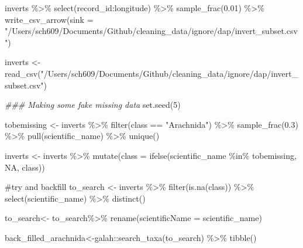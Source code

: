 \documentclass[
  letterpaper,
  DIV=11,
  numbers=noendperiod,
  oneside]{scrreprt}
\newenvironment{Shaded}{\begin{snugshade}}{\end{snugshade}}
\newcommand{\AttributeTok}[1]{\textcolor[rgb]{0.40,0.45,0.13}{#1}}
\newcommand{\CommentTok}[1]{\textcolor[rgb]{0.37,0.37,0.37}{#1}}
\newcommand{\ConstantTok}[1]{\textcolor[rgb]{0.56,0.35,0.01}{#1}}
\newcommand{\DecValTok}[1]{\textcolor[rgb]{0.68,0.00,0.00}{#1}}
\newcommand{\DocumentationTok}[1]{\textcolor[rgb]{0.37,0.37,0.37}{\textit{#1}}}
\newcommand{\FloatTok}[1]{\textcolor[rgb]{0.68,0.00,0.00}{#1}}
\newcommand{\FunctionTok}[1]{\textcolor[rgb]{0.28,0.35,0.67}{#1}}
\newcommand{\NormalTok}[1]{\textcolor[rgb]{0.00,0.23,0.31}{#1}}
\newcommand{\OtherTok}[1]{\textcolor[rgb]{0.00,0.23,0.31}{#1}}
\newcommand{\SpecialCharTok}[1]{\textcolor[rgb]{0.37,0.37,0.37}{#1}}
\newcommand{\StringTok}[1]{\textcolor[rgb]{0.13,0.47,0.30}{#1}}
\begin{document}
\begin{Shaded}
\begin{Highlighting}[]
\NormalTok{inverts }\SpecialCharTok{\%\textgreater{}\%}
  \FunctionTok{select}\NormalTok{(record\_id}\SpecialCharTok{:}\NormalTok{longitude) }\SpecialCharTok{\%\textgreater{}\%}
  \FunctionTok{sample\_frac}\NormalTok{(}\FloatTok{0.01}\NormalTok{) }\SpecialCharTok{\%\textgreater{}\%}
  \FunctionTok{write\_csv\_arrow}\NormalTok{(}\AttributeTok{sink =} \StringTok{"/Users/sch609/Documents/Github/cleaning\_data/ignore/dap/invert\_subset.csv"}\NormalTok{)}

\NormalTok{inverts }\OtherTok{\textless{}{-}} \FunctionTok{read\_csv}\NormalTok{(}\StringTok{"/Users/sch609/Documents/Github/cleaning\_data/ignore/dap/invert\_subset.csv"}\NormalTok{)}

\DocumentationTok{\#\#\# Making some fake missing data}
\FunctionTok{set.seed}\NormalTok{(}\DecValTok{5}\NormalTok{)}

\NormalTok{tobemissing }\OtherTok{\textless{}{-}}\NormalTok{ inverts }\SpecialCharTok{\%\textgreater{}\%}
  \FunctionTok{filter}\NormalTok{(class }\SpecialCharTok{==} \StringTok{"Arachnida"}\NormalTok{) }\SpecialCharTok{\%\textgreater{}\%}
  \FunctionTok{sample\_frac}\NormalTok{(}\FloatTok{0.3}\NormalTok{) }\SpecialCharTok{\%\textgreater{}\%}
  \FunctionTok{pull}\NormalTok{(scientific\_name) }\SpecialCharTok{\%\textgreater{}\%}
  \FunctionTok{unique}\NormalTok{()}

\NormalTok{inverts }\OtherTok{\textless{}{-}}\NormalTok{ inverts }\SpecialCharTok{\%\textgreater{}\%}
  \FunctionTok{mutate}\NormalTok{(}\AttributeTok{class =} \FunctionTok{ifelse}\NormalTok{(scientific\_name }\SpecialCharTok{\%in\%}\NormalTok{ tobemissing, }\ConstantTok{NA}\NormalTok{, class))}

\CommentTok{\#try and backfill}
\NormalTok{to\_search }\OtherTok{\textless{}{-}}\NormalTok{ inverts }\SpecialCharTok{\%\textgreater{}\%} 
  \FunctionTok{filter}\NormalTok{(}\FunctionTok{is.na}\NormalTok{(class)) }\SpecialCharTok{\%\textgreater{}\%} 
  \FunctionTok{select}\NormalTok{(scientific\_name) }\SpecialCharTok{\%\textgreater{}\%} 
  \FunctionTok{distinct}\NormalTok{()}

\NormalTok{to\_search}\OtherTok{\textless{}{-}}\NormalTok{ to\_search}\SpecialCharTok{\%\textgreater{}\%}
  \FunctionTok{rename}\NormalTok{(}\AttributeTok{scientificName =}\NormalTok{ scientific\_name)}

\NormalTok{back\_filled\_arachnida}\OtherTok{\textless{}{-}}\NormalTok{galah}\SpecialCharTok{::}\FunctionTok{search\_taxa}\NormalTok{(to\_search) }\SpecialCharTok{\%\textgreater{}\%} \FunctionTok{tibble}\NormalTok{()}
\end{Highlighting}
\end{Shaded}
\end{document}
